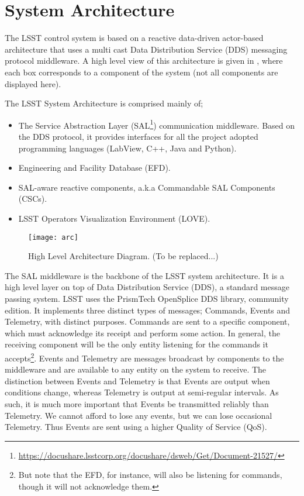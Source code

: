 \section{System Architecture} \label{sec:sysarc}


The LSST control system is based on a reactive data-driven actor-based architecture that uses a multi cast Data Distribution Service 
(DDS) messaging protocol middleware. A high level view of this architecture is given in , where each box corresponds to a 
component of the system (not all components are displayed here).

The LSST System Architecture is comprised mainly of;
%
\begin{itemize}
\item The Service Abstraction Layer (SAL\footnote{\url{https://docushare.lsstcorp.org/docushare/dsweb/Get/Document-21527/}}) communication middleware. Based on the DDS protocol, it provides interfaces for all the project adopted programming languages (LabView, C++, Java and Python).
\item Engineering and Facility Database (EFD).
\item SAL-aware reactive components, a.k.a Commandable SAL Components (CSCs).
\item LSST Operators Visualization Environment (LOVE).
\end{itemize}

\begin{figure}
\begin{center}
\texttt{[image: arc]}
\caption{High Level Architecture Diagram. (To be replaced...)\label{fig:arc}}
\end{center}
\end{figure}

The SAL middleware is the backbone of the LSST system architecture. It is a high level layer on top of Data 
Distribution Service (DDS), a standard message passing system. LSST uses the PrismTech OpenSplice DDS library, 
community edition. It implements three distinct types of messages; Commands, Events and Telemetry, with distinct 
purposes. Commands are sent to a specific component, which must acknowledge its receipt and perform some action. 
In general, the receiving component will be the only entity listening for the commands it accepts\footnote{But note that the EFD, for instance, will also be listening for 
commands, though it will not acknowledge them.}. Events and Telemetry are messages broadcast by components to the 
middleware and are available to any entity on the system to receive. The distinction between Events and Telemetry is that 
Events are output when conditions change, whereas Telemetry is output at semi-regular intervals. As such, it is much more 
important that Events be transmitted reliably than Telemetry. We cannot afford to lose any events, but we can lose occasional 
Telemetry. Thus Events are sent using a higher Quality of Service (QoS).

